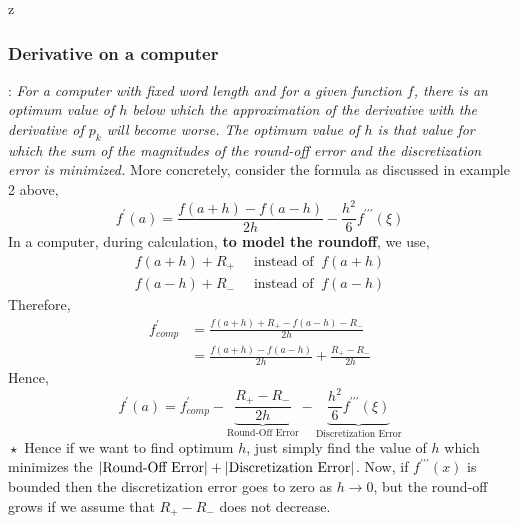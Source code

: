 z\documentclass[a4paper,12pt,twoside]{book}
\newcommand{\nll}[0]{\newline\newline}
\newcommand{\tit}[1]{\textit{#1}}
\newcommand{\theor}[1]{\boxed{\textbf{\textit{Theorem \thechapter.#1}}}}
\DeclarePairedDelimiter\abs{\lvert}{\rvert}
\begin{document}
\subsubsection{Derivative on a computer}
\theor{12}  : \tit{For a computer with fixed word length and for a given function $f$, there is an optimum value of $h$ below which the approximation of the derivative with the derivative of $p_k$ will become worse. The optimum value of $h$ is that value for which the sum of the magnitudes of the round-off error and the discretization error is minimized.}
\nll
More concretely, consider the formula as discussed in example 2 above,
\[f^\prime(a) = \frac{f(a+h)-f(a-h)}{2h} - \frac{h^2}{6}f^{\prime\prime\prime}(\xi)\]
In a computer, during calculation, \textbf{to model the roundoff}, we use,
\begin{equation}
    \begin{split}
        f(a+h) + R_+ \;\;&\text{instead of}\;\;f(a+h)\\
        f(a-h) + R_- \;\;&\text{instead of}\;\;f(a-h)
    \end{split}
\end{equation}
Therefore,
\begin{equation}
    \begin{split}
        f^\prime_{comp} &= \frac{f(a+h) + R_+ - f(a-h) - R_-}{2h}\\
        &= \frac{f(a+h) - f(a-h)}{2h} + \frac{R_+ - R_-}{2h}
    \end{split}
\end{equation}
Hence,
\begin{equation}
   \boxed{ f^\prime(a) = f^\prime_{comp} - \underbrace{\frac{R_+ - R_-}{2h}}_{\text{Round-Off Error}} - \underbrace{\frac{h^2}{6}f^{\prime\prime\prime}(\xi)}_{\text{Discretization Error}}}
\end{equation}
$\boxed{\star}$ Hence if we want to find optimum $h$, just simply find the value of $h$ which minimizes the $\abs*{\text{Round-Off Error}} + \abs*{\text{Discretization Error}}$.
\nll
Now, if $f^{\prime\prime\prime}(x)$ is bounded then the discretization error goes to zero as $h\to 0$, but the round-off grows if we assume that $R_+ - R_-$ does not decrease.
\newpage
\end{document}
